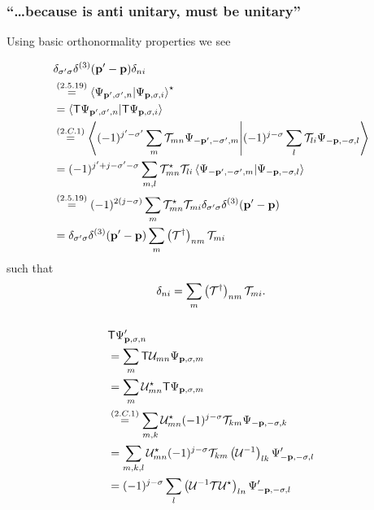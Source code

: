 \subsubsection{\enquote{\dots because \timereversal is anti unitary, \timereversalmatrix must be unitary} }
Using basic orthonormality properties we see

\begin{align*}
	&\delta_{\sigma^\prime \sigma} \delta^{(3)}(\mathbf{p}^\prime-\mathbf{p})\delta_{ni}\\
	&\overset{({2.5.19})}{=}\braket{\Psi_{\mathbf{p}^\prime,\sigma^\prime,n}}{\Psi_{\mathbf{p},\sigma,i}}^\star\\
	&=\braket{\mathsf{T} \Psi_{\mathbf{p}^\prime,\sigma^\prime,n}}{\mathsf{T}\Psi_{\mathbf{p},\sigma,i}}\\
	&\overset{({2.C.1})}{=}\braket{(-1)^{j^\prime-\sigma^\prime}\sum\limits_{m}\mathcal{T}_{mn}\Psi_{-\mathbf{p}^\prime,-\sigma^\prime,m}}{(-1)^{j-\sigma}\sum\limits_{l}\mathcal{T}_{li}\Psi_{-\mathbf{p},-\sigma,l}}\\
	&=(-1)^{j^\prime+j-\sigma^\prime-\sigma}\sum\limits_{m,l}\mathcal{T}_{mn}^\star\mathcal{T}_{li}\braket{\Psi_{-\mathbf{p}^\prime,-\sigma^\prime,m}}{\Psi_{-\mathbf{p},-\sigma,l}}\\
	&\overset{({2.5.19})}{=}(-1)^{2(j-\sigma)}\sum\limits_{m}\mathcal{T}_{mn}^\star\mathcal{T}_{mi}\delta_{\sigma^\prime \sigma} \delta^{(3)}(\mathbf{p}^\prime-\mathbf{p})\\
	&=\delta_{\sigma^\prime \sigma} \delta^{(3)}(\mathbf{p}^\prime-\mathbf{p})
	\sum\limits_{m}\left(\mathcal{T}^\dagger\right)_{nm}\mathcal{T}_{mi}
\end{align*}
such that
\[\delta_{ni}=\sum\limits_{m}\left(\mathcal{T}^\dagger\right)_{nm}\mathcal{T}_{mi}.\]

\subsubsection{ }
\begin{align*}
	&\mathsf{T} \Psi_{\mathbf{p},\sigma,n}^\prime\\
	&=\sum\limits_{m}\mathsf{T}\mathcal{U}_{mn}\Psi_{\mathbf{p},\sigma,m}\\
	&=\sum\limits_{m}\mathcal{U}_{mn}^\star\mathsf{T}\Psi_{\mathbf{p},\sigma,m}\\
	&\overset{({2.C.1})}{=}\sum\limits_{m,k}\mathcal{U}_{mn}^\star(-1)^{j-\sigma}\mathcal{T}_{km}\Psi_{-\mathbf{p},-\sigma,k}\\
	&=\sum\limits_{m,k,l}\mathcal{U}_{mn}^\star(-1)^{j-\sigma}\mathcal{T}_{km}\left(\mathcal{U}^{-1}\right)_{lk}\Psi_{-\mathbf{p},-\sigma,l}^\prime\\
	&=(-1)^{j-\sigma}\sum\limits_{l}\left(\mathcal{U}^{-1}\mathcal{T} \mathcal{U}^\star\right)_{ln}\Psi_{-\mathbf{p},-\sigma,l}^\prime
\end{align*}

